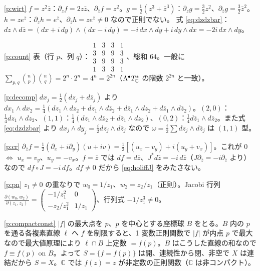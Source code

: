\begin{sol}{\ref{p:wirt}}
$f=z^2\bar z$：$\partial_zf=2z\bar z$、$\partial_{\bar z}f=z^2$。$g=\frac12(z^3+\bar z^3)$：$\partial_zg=\frac32z^2$、$\partial_{\bar z}g=\frac32\bar z^2$。$h=ze^{\bar z}$：$\partial_zh=e^{\bar z}$、$\partial_{\bar z}h=ze^{\bar z}\ne0$ なので正則でない。
式 \eqref{eq:dzdzbar}：$dz\wedge d\bar z=(dx+i\,dy)\wedge(dx-i\,dy)=-i\,dx\wedge dy+i\,dy\wedge dx=-2i\,dx\wedge dy$。
\end{sol}
\begin{sol}{\ref{p:count}}
表（行 $p$、列 $q$）：$\begin{smallmatrix}1&3&3&1\\3&9&9&3\\3&9&9&3\\1&3&3&1\end{smallmatrix}$、総和 $64$。一般に $\sum_{p,q}\binom np\binom nq=2^n\cdot2^n=4^n=2^{2n}$（$\Lambda^\bullet T_{\mathbb C}^*$ の階数 $2^{2n}$ と一致）。
\end{sol}
\begin{sol}{\ref{p:decomp}}
$dx_j=\frac12(dz_j+d\bar z_j)$ より $dx_1\wedge dx_2=\frac14(dz_1\wedge dz_2+dz_1\wedge d\bar z_2+d\bar z_1\wedge dz_2+d\bar z_1\wedge d\bar z_2)$。$(2,0)$：$\frac14dz_1\wedge dz_2$、$(1,1)$：$\frac14(dz_1\wedge d\bar z_2+d\bar z_1\wedge dz_2)$、$(0,2)$：$\frac14d\bar z_1\wedge d\bar z_2$。また式 \eqref{eq:dzdzbar} より $dx_j\wedge dy_j=\frac i2dz_j\wedge d\bar z_j$ なので $\omega=\frac i2\sum dz_j\wedge d\bar z_j$ は $(1,1)$ 型。
\end{sol}
\begin{sol}{\ref{p:cr}}
$\partial_{\bar z}f=\frac12(\partial_x+i\partial_y)(u+iv)=\frac12[(u_x-v_y)+i(u_y+v_x)]$。これが $0$ $\iff$ $u_x=v_y$、$u_y=-v_x$。$f=\bar z$ では $df=d\bar z$、$J^*d\bar z=-i\,d\bar z$（$J\partial_{\bar z}=-i\partial_{\bar z}$ より）なので $df\circ J=-i\,df$。$df\ne0$ だから \eqref{eq:holiffJ} をみたさない。
\end{sol}
\begin{sol}{\ref{p:pn}}
$z_1\neq0$ の重なりで $w_0=1/z_1$、$w_2=z_2/z_1$（正則）。Jacobi 行列 $\frac{\partial(w_0,w_2)}{\partial(z_1,z_2)}=\begin{pmatrix}-1/z_1^2&0\\-z_2/z_1^2&1/z_1\end{pmatrix}$、行列式 $-1/z_1^3\ne0$。
\end{sol}
\begin{sol}{\ref{p:compactconst}}
$|f|$ の最大点を $p$、$p$ を中心とする座標球 $B$ をとる。$B$ 内の $p$ を通る各複素直線 $\ell$ へ $f$ を制限すると、1 変数正則関数で $|f|$ が内点 $p$ で最大なので最大値原理により $\ell\cap B$ 上定数 $=f(p)$。$B$ はこうした直線の和なので $f\equiv f(p)$ on $B$。よって $S=\{f=f(p)\}$ は開、連続性から閉、非空で $X$ は連結だから $S=X$。$\mathbb C$ では $f(z)=z$ が非定数の正則関数（$\mathbb C$ は非コンパクト）。
\end{sol}
